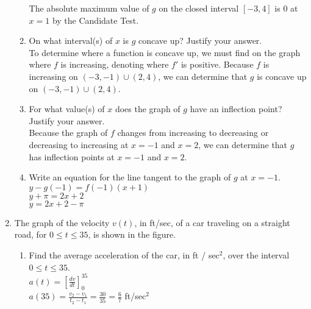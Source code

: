 \documentclass[10pt, letterpaper]{report}
\begin{document}
\begin{enumerate}
\begin{enumerate}
      The absolute maximum value of $g$ on the closed interval $[-3,4]$ is $0$ at $x=1$ by the Candidate Test.\\

    \item{On what interval(s) of $x$ is $g$ concave up? Justify your answer.} \\

      To determine where a function is concave up, we must find on the graph where $f$ is increasing, denoting where $f'$ is positive. Because $f$ is increasing on $(-3,-1)\cup(2,4)$, we can determine that $g$ is concave up on $(-3,-1)\cup(2,4)$. \\

    \item{For what value(s) of $x$ does the graph of $g$ have an inflection point? Justify your answer.} \\

      Because the graph of $f$ changes from increasing to decreasing or decreasing to increasing at $x=-1$ and $x=2$, we can determine that $g$ has inflection points at $x=-1$ and $x=2$.\\

    \item{Write an equation for the line tangent to the graph of $g$ at $x=-1$.} \\

      $y - g(-1) = f(-1)(x + 1)$ \\

      $y + \pi = 2x + 2$ \\

      $y = 2x + 2 - \pi$ \\

  \end{enumerate}
\pagebreak
  \item{The graph of the velocity $v(t)$, in ft/sec, of a car traveling on a straight road, for $0\leq t\leq 35$, is shown in the figure.}
  \begin{enumerate}
    \item{Find the average acceleration of the car, in ft / sec$^{2}$, over the interval $0\leq t\leq 35$.} \\

      $a(t) = [\frac{dv}{dt}]_{0}^{35}$ \\

      $a(35) = \frac{v_{2}-v_{1}}{t_{2}-t_{1}} = \frac{30}{35} = \frac{6}{7}$ ft/sec$^{2}$ \\


\end{enumerate}
\end{enumerate}
\end{document}
